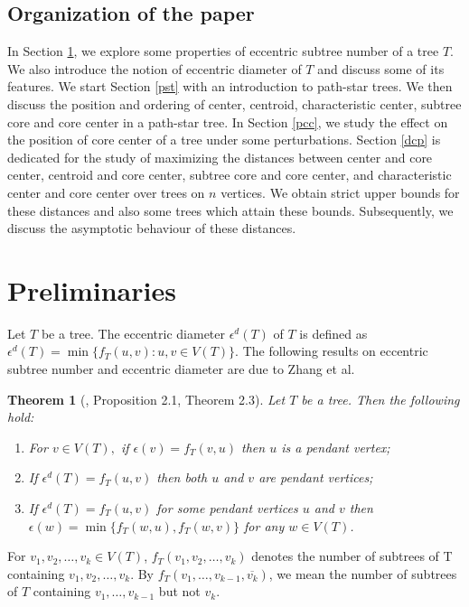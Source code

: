 \documentclass[11pt]{article}
\newtheorem{theorem}{Theorem}[section]
\begin{document}
\subsection{Organization of the paper}

In Section \ref{Prim}, we explore some properties of eccentric subtree number of a tree  $T$. We also introduce the notion of eccentric diameter of $T$ and discuss some of its features. We start Section \ref{pst} with an introduction to path-star trees. We then discuss the position and ordering of center, centroid, characteristic center, subtree core and core center in a path-star tree. In Section \ref{pcc}, we study the effect on the position of core center of a tree under some perturbations. Section \ref{dcp} is dedicated for the study of maximizing the distances between center and core center, centroid and core center, subtree core and core center, and characteristic center and core center over trees on $n$ vertices. We obtain strict upper bounds for these distances and also some trees which attain these bounds. Subsequently, we discuss the asymptotic behaviour of these distances.

\section{Preliminaries}\label{Prim}

Let $T$ be a tree. The eccentric diameter $\epsilon^d(T)$ of $T$ is defined as $\epsilon^d(T)=\min\{f_T(u,v): u, v\in V(T)\}$. The following results on eccentric subtree number and eccentric diameter are due to Zhang et al.

\begin{theorem}[\cite{Zhang}, Proposition 2.1, Theorem 2.3]\label{zha1}
Let $T$ be a tree. Then the following hold:
\begin{enumerate}
\item[(i)] For $v\in V(T),$ if $\epsilon(v)= f_T(v,u)$ then $u$ is a pendant vertex;
\item[(ii)] If $\epsilon^d(T)=f_T(u,v)$ then both $u$ and $v$ are pendant vertices;
\item[(iii)] If $\epsilon^d(T)=f_T(u,v)$ for some pendant vertices $u$ and $v$ then $\epsilon(w)=\min\{f_T(w,u), f_T(w,v)\}$ for any $w\in V(T)$.
\end{enumerate}
\end{theorem}
For $v_1,v_2,\ldots,v_k\in V(T)$, $f_T(v_1,v_2,\ldots,v_k)$ denotes the number of subtrees of T containing $v_1,v_2,\ldots,v_k$. By $f_T(v_1,\ldots,v_{k-1},\overline{v_k})$, we mean the number of subtrees of $T$ containing $v_1,\ldots,v_{k-1}$ but not $v_k$.
\end{document}
